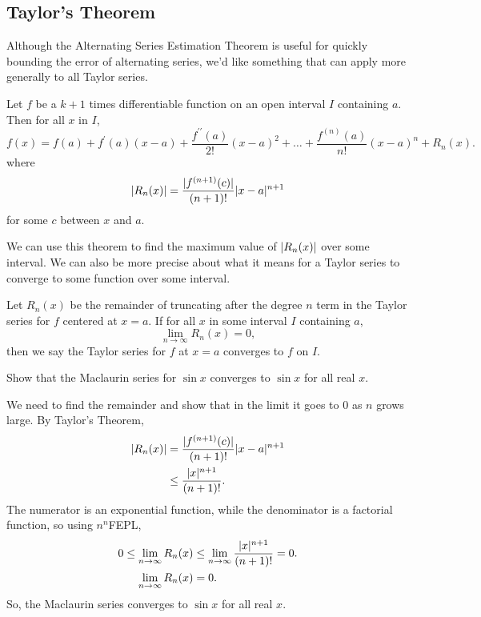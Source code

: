 \subsection{Taylor's Theorem}
Although the Alternating Series Estimation Theorem is useful for quickly bounding the error of alternating series, we'd like something that can apply more generally to all Taylor series.
\begin{theorem}
	Let $f$ be a $k+1$ times differentiable function on an open interval $I$ containing $a$.
	Then for all $x$ in $I$,
	\begin{equation*}
		f(x) = f(a) + f^\prime(a)(x-a) + \frac{f^{\prime\prime}(a)}{2!}(x-a)^2 + \ldots + \frac{f^{(n)}(a)}{n!}(x-a)^n + R_n(x).
	\end{equation*}
	where
	\begin{equation*}
		\lvert R_n(x) \rvert = \frac{\lvert f^{(n+1)}(c) \rvert}{(n+1)!}\lvert x-a \rvert^{n+1}
	\end{equation*}
	for some $c$ between $x$ and $a$.
\end{theorem}
\noindent
We can use this theorem to find the maximum value of $\lvert R_n(x) \rvert$ over some interval.
We can also be more precise about what it means for a Taylor series to converge to some function over some interval.
\begin{definition}
	Let $R_n(x)$ be the remainder of truncating after the degree $n$ term in the Taylor series for $f$ centered at $x=a$.
	If for all $x$ in some interval $I$ containing $a$,
	\begin{equation*}
		\lim_{n\to\infty}{R_n(x)} = 0,
	\end{equation*}
	then we say the Taylor series for $f$ at $x=a$ converges to $f$ on $I$.
\end{definition}

\begin{example}
	Show that the Maclaurin series for $\sin{x}$ converges to $\sin{x}$ for all real $x$.
\end{example}
We need to find the remainder and show that in the limit it goes to 0 as $n$ grows large.
By Taylor's Theorem,
\begin{align*}
	\lvert R_n(x) \rvert &= \frac{\lvert f^{(n+1)}(c) \rvert}{(n+1)!}\lvert x-a \rvert^{n+1} \\
	&\leq \frac{\lvert x \rvert^{n+1}}{(n+1)!}.
\end{align*}
\indent
The numerator is an exponential function, while the denominator is a factorial function, so using $n^n$FEPL,
\begin{align*}
	0 \leq \lim_{n\to\infty}{R_n(x)} &\leq \lim_{n\to\infty}{\frac{\lvert x \rvert^{n+1}}{(n+1)!}} = 0. \\
	\lim_{n\to\infty}{R_n(x)} &= 0.
\end{align*}
\indent
So, the Maclaurin series converges to $\sin{x}$ for all real $x$.

